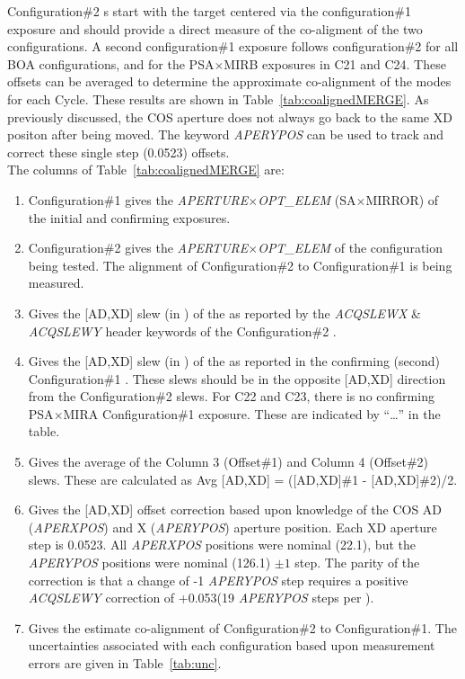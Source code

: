 Configuration\#2 s start with the target centered via the configuration\#1 exposure and
should provide a direct measure of the co-aligment of the two configurations.
A second configuration\#1 exposure follows configuration\#2 for all BOA configurations, and for the PSA$\times$MIRB exposures in C21 and C24.
These offsets can be averaged to determine the approximate co-alignment of the modes for each Cycle.
These results are shown in Table~\ref{tab:coalignedMERGE}. As previously discussed, the COS aperture does not always go back to
the same XD positon after being moved. The keyword \textit{APERYPOS} can be used to track and correct these single step (0.0523\arcsec) offsets.\\

The columns of Table~\ref{tab:coalignedMERGE} are:
\footnotesize
\begin{enumerate}
\item Configuration\#1 gives the \textit{APERTURE}$\times$\textit{OPT\_ELEM} (SA$\times$MIRROR) of the initial and confirming  exposures.
\item Configuration\#2 gives the \textit{APERTURE}$\times$\textit{OPT\_ELEM} of the  configuration being tested. The alignment of Configuration\#2 to
Configuration\#1 is being measured.
\item Gives the [AD,XD] slew (in \arcsec)  of the  as reported by the \textit{ACQSLEWX} \& \textit{ACQSLEWY} header keywords of the Configuration\#2 .
\item Gives the [AD,XD] slew (in \arcsec)  of the  as reported in the confirming (second) Configuration\#1 . These slews should be in the opposite [AD,XD]
direction from the Configuration\#2 slews. For C22 and C23, there is no confirming PSA$\times$MIRA Configuration\#1 exposure. These are indicated by ``\dots'' in the table.
\item Gives the average of the Column 3 (Offset\#1) and Column 4 (Offset\#2) slews. These are calculated as Avg [AD,XD] = ([AD,XD]\#1 - [AD,XD]\#2)/2.
\item Gives the [AD,XD] offset correction based upon knowledge of the COS AD (\textit{APERXPOS}) and X (\textit{APERYPOS}) aperture position. Each XD aperture step is 0.0523\arcsec.
All \textit{APERXPOS} positions were nominal (22.1), but the \textit{APERYPOS} positions were nominal (126.1) $\pm 1$ step. The parity of the correction is that a change of -1 \textit{APERYPOS} step requires a positive
\textit{ACQSLEWY} correction of +0.053\arcsec (19 \textit{APERYPOS} steps per \arcsec).
\item Gives the estimate co-alignment of Configuration\#2 to Configuration\#1. The uncertainties associated with each  configuration based upon measurement errors are given in Table~\ref{tab:unc}.
\end{enumerate}
\normalsize

